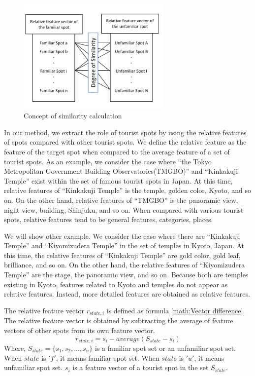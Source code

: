 \documentclass[journal]{IAENGtran}
\begin{document}
\begin{figure}[t]
  \begin{center}
    \includegraphics[clip,width=7.5cm,bb=0 0 720 540]{picture/Photo_CosSim_eng.png}
    \caption{Concept of similarity calculation}
    \label{fig:Photo_CosSim}
  \end{center}
\end{figure}

In our method, we extract the role of tourist spots by using the relative features of spots compared with other tourist spots.
We define the relative feature as the feature of the target spot when compared to the average feature of a set of tourist spots.
As an example, we consider the case where ``the Tokyo Metropolitan Government Building Observatories(TMGBO)'' and ``Kinkakuji Temple'' exist within the set of famous tourist spots in Japan.
At this time, relative features of ``Kinkakuji Temple'' is the temple, golden color, Kyoto, and so on.
On the other hand, relative features of ``TMGBO'' is the panoramic view, night view, building, Shinjuku, and so on.
When compared with various tourist spots, relative features tend to be general features, categories, places.

We will show other example.
We consider the case where there are ``Kinkakuji Temple'' and ``Kiyomizudera Temple'' in the set of temples in Kyoto, Japan.
At this time, the relative features of ``Kinkakuji Temple'' are gold color, gold leaf, brilliance, and so on.
On the other hand, the relative features of ``Kiyomizudera Temple'' are the stage, the panoramic view, and so on.
Because both are temples existing in Kyoto, features related to Kyoto and temples do not appear as relative features.
Instead, more detailed features are obtained as relative features.

The relative feature vector $r_{state,i}$ is defined as formula \ref{math:Vector difference}.
The relative feature vector is obtained by subtracting the average of feature vectors of other spots from its own feature vector.
\begin{equation}
  r_{state,i}=s_i-average(S_{state}-s_i)
  \label{math:Vector difference}
\end{equation}
Where, $S_{state} =\{s_1,s_2,\dots,s_n\}$ is a familiar spot set or an unfamiliar spot set.
When $state$ is $'f'$, it means familiar spot set.
When $state$ is $'u'$, it means unfamiliar spot set.
$s_i$ is a feature vector of a tourist spot in the set $S_{state}$.
\end{document}
